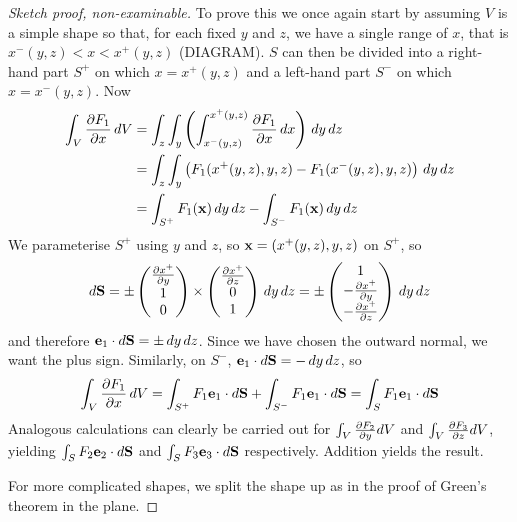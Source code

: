 \documentclass{../../template/note}
\begin{document}
    \begin{proof}[Sketch proof, non-examinable]
        To prove this we once again start by assuming \(V\) is a simple shape so that, for each fixed \(y\) and \(z\), we have a single range of \(x\), that is \(x^-(y, z) < x < x^+(y, z)\) (DIAGRAM). \(S\) can then be divided into a right-hand part \(S^+\) on which \(x = x^+(y, z)\) and a left-hand part \(S^-\) on which \(x = x^-(y, z)\). Now
        \begin{align*}
            \int_V \pd{F_1} x \D V &= \int_z \int_y \left(\int_{x^-(y, z)}^{x^+(y, z)} \pd{F_1} x \D x\right) \D y \D z \\
            &= \int_z \int_y \left(F_1(x^+(y, z), y, z) - F_1(x^-(y, z), y, z)\right) \D y \D z \\
            &= \int_{S^+} F_1(\V x) \D y \D z - \int_{S^-} F_1(\V x) \D y \D z
        \end{align*}
        We parameterise \(S^+\) using \(y\) and \(z\), so \(\V x = (x^+(y, z), y, z)\) on \(S^+\), so
        \begin{align*}
            d\V S = \pm \begin{pmatrix}
             \pd{x^+}{y} \\
             1 \\
             0 \\
            \end{pmatrix} \times \begin{pmatrix}
             \pd{x^+}{z} \\
             0 \\
             1 \\
            \end{pmatrix} \D y \D z = \pm \begin{pmatrix}
             1 \\
             -\pd{x^+}y \\
             -\pd{x^+}z \\
            \end{pmatrix} \D y \D z
        \end{align*}
        and therefore \(\V e_1 \cdot d \V S = \pm \D y \D z\). Since we have chosen the outward normal, we want the plus sign. Similarly, on \(S^-\), \(\V e_1 \cdot d \V S = -\D y \D z\), so
        \begin{align*}
            \int_V \pd{F_1} x \D V = \int_{S^+} F_1 \V e_1 \cdot d\V S + \int_{S^-} F_1 \V e_1 \cdot d\V S = \int_S F_1 \V e_1 \cdot d\V S
        \end{align*}
        Analogous calculations can clearly be carried out for \(\int_V \pd{F_2} y dV\) and \(\int_V \pd{F_3} z dV\), yielding \(\int_S F_2 \V e_2 \cdot d \V S\) and \(\int_S F_3 \V e_3 \cdot d \V S\) respectively. Addition yields the result.

        For more complicated shapes, we split the shape up as in the proof of Green's theorem in the plane.    
    \end{proof}
    
\end{document}
